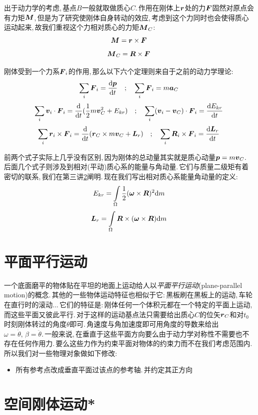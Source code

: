 出于动力学的考虑,\,基点$B$一般就取做质心$C$.\,作用在刚体上$\boldsymbol{r}$处的力$\boldsymbol{F}$固然对原点会有力矩$\boldsymbol{M}$,\,但是为了研究使刚体自身转动的效应,\,考虑到这个力同时也会使得质心运动起来,\,故我们重视这个力相对质心的力矩$\boldsymbol{M}_C$:
\[\boldsymbol{M}=\boldsymbol{r}\times\boldsymbol{F}\]
\[\boldsymbol{M}_C=\boldsymbol{R}\times\boldsymbol{F}\]

刚体受到一个力系${\boldsymbol{F}_i}$的作用,\,那么以下六个定理则来自于之前的动力学理论:
\[\sum_i\boldsymbol{F}_i=\frac{\textrm{d} \boldsymbol{p}}{\textrm{d} t}\quad ; \quad \sum_i\boldsymbol{F}_i=m\boldsymbol{a}_C\]
\[\sum_i \boldsymbol{v}_i\cdot \boldsymbol{F}_i=\frac{\textrm{d} }{\textrm{d} t}(\frac{1}{2}m\boldsymbol{v}_C^2+E_{kr})\quad ;\quad \sum_i(\boldsymbol{v}_i-\boldsymbol{v}_C)\cdot \boldsymbol{F}_i=\frac{\textrm{d} E_{kr}}{\textrm{d} t}\]
\[\sum_i \boldsymbol{r}_i\times \boldsymbol{F}_i=\frac{\textrm{d} }{\textrm{d} t}(\boldsymbol{r}_C\times m\boldsymbol{v}_C+\boldsymbol{L}_r)\quad ;\quad \sum_i \boldsymbol{R}_i\times \boldsymbol{F}_i=\frac{\textrm{d} \boldsymbol{L}_r}{\textrm{d} t}\]

前两个式子实际上几乎没有区别,\,因为刚体的总动量其实就是质心动量$\boldsymbol{p}=m\boldsymbol{v}_C$.\,后面几个式子则涉及到相对(平动)质心系的能量与角动量.\,它们与质量二级矩有着密切的联系,\,我们在第三讲\ref{6.3}阐明.\,现在我们写出相对质心系能量角动量的定义:
\[E_{kr}=\int\limits_\Omega \frac{1}{2}(\boldsymbol{\omega}\times \boldsymbol{R})^2\textrm{d} m\]
\[\boldsymbol{L}_r=\int\limits_\Omega \boldsymbol{R}\times(\boldsymbol{\omega}\times \boldsymbol{R})\textrm{d} m\]




\section{平面平行运动}
一个底面磨平的物体贴在平坦的地面上运动给人以\emph{平面平行运动}(plane-parallel motion)的概念.\,其他的一些物体运动特征也相似于它:\,黑板刷在黑板上的运动,\,车轮在直行时的滚动...\,它们的特征是:\,刚体任何一个体积元都在一个特定的平面上运动,\,而这些平面又彼此平行.\,对于这样的运动基点法只需要给出质心$C$的位矢$\boldsymbol{r}_C$和对$t_0$时刻刚体转过的角度$\theta$即可.\,角速度与角加速度即可用角度的导数来给出$\omega=\dot{\theta},\,\beta=\ddot{\theta}$.\,一般来说,\,在垂直于这些平面方向要么由于动力学对称性不需要也不存在任何作用力.\,要么这些力作为约束平面对物体的约束力而不在我们考虑范围内.\,所以我们对一些物理对象做如下修改:\,
\begin{itemize}
\item 所有参考点改成垂直平面过该点的参考轴.\,并约定其正方向
\end{itemize}
\section{空间刚体运动*}\label{6.3}

